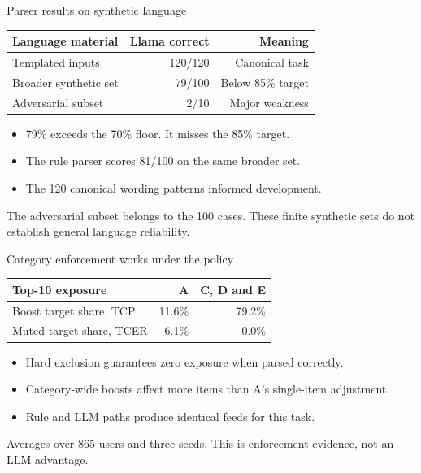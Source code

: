 \documentclass[10pt]{beamer}
\newcommand{\toprule}{\hline}
\newcommand{\midrule}{\hline}
\newcommand{\bottomrule}{\hline}
\newcommand{\src}[1]{\vfill{\tiny\color{bcitgray}#1}}
\begin{document}
\begin{frame}{Parser results on synthetic language}
\begin{tabular}{@{}lrr@{}}
\toprule
Language material & Llama correct & Meaning\\\midrule
Templated inputs & 120/120 & Canonical task\\
Broader synthetic set & 79/100 & Below 85\% target\\
Adversarial subset & 2/10 & Major weakness\\\bottomrule
\end{tabular}\par
\vspace{0.3cm}
\begin{itemize}
\item 79\% exceeds the 70\% floor. It misses the 85\% target.
\item The rule parser scores 81/100 on the same broader set.
\item The 120 canonical wording patterns informed development.
\end{itemize}
\src{The adversarial subset belongs to the 100 cases. These finite synthetic sets do not establish general language reliability.}
\end{frame}

\begin{frame}{Category enforcement works under the policy}
\begin{tabular}{@{}lrr@{}}
\toprule
Top-10 exposure & A & C, D and E\\\midrule
Boost target share, TCP & 11.6\% & 79.2\%\\[0.15cm]
Muted target share, TCER & 6.1\% & 0.0\%\\\bottomrule
\end{tabular}\par
\vspace{0.4cm}
\begin{itemize}
\item Hard exclusion guarantees zero exposure when parsed correctly.
\item Category-wide boosts affect more items than A's single-item adjustment.
\item Rule and LLM paths produce identical feeds for this task.
\end{itemize}
\src{Averages over 865 users and three seeds. This is enforcement evidence, not an LLM advantage.}
\end{frame}
\end{document}
